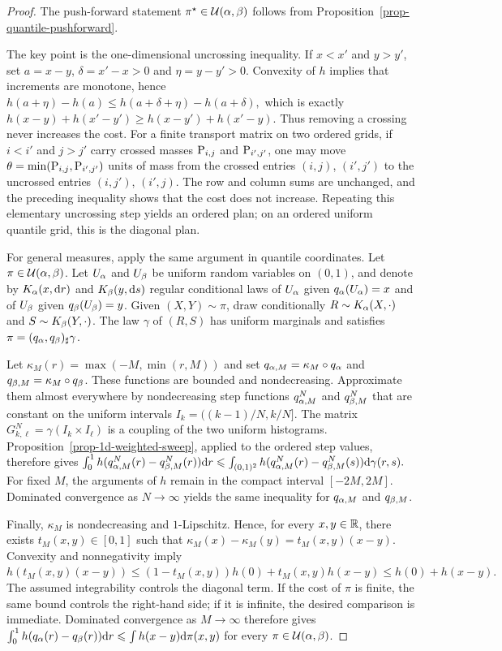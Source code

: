 \begin{proof}
The push-forward statement $\pi^\star\in\Couplings(\al,\be)$ follows from Proposition~\ref{prop-quantile-pushforward}.

The key point is the one-dimensional uncrossing inequality. If $x<x'$ and $y>y'$, set $a=x-y$, $\delta=x'-x>0$ and $\eta=y-y'>0$. Convexity of $h$ implies that increments are monotone, hence
\(h(a+\eta)-h(a) \leq h(a+\delta+\eta)-h(a+\delta),\)
which is exactly
\(h(x-y)+h(x'-y') \geq h(x-y')+h(x'-y)\).
Thus removing a crossing never increases the cost. For a finite transport matrix on two ordered grids, if $i<i'$ and $j>j'$ carry crossed masses $\P_{i,j}$ and $\P_{i',j'}$, one may move $\theta=\min(\P_{i,j},\P_{i',j'})$ units of mass from the crossed entries $(i,j)$, $(i',j')$ to the uncrossed entries $(i,j')$, $(i',j)$. The row and column sums are unchanged, and the preceding inequality shows that the cost does not increase. Repeating this elementary uncrossing step yields an ordered plan; on an ordered uniform quantile grid, this is the diagonal plan.

For general measures, apply the same argument in quantile coordinates. Let $\pi\in\Couplings(\al,\be)$. Let $U_\al$ and $U_\be$ be uniform random variables on $(0,1)$, and denote by $K_\al(x,\d r)$ and $K_\be(y,\d s)$ regular conditional laws of $U_\al$ given $q_\al(U_\al)=x$ and of $U_\be$ given $q_\be(U_\be)=y$. Given $(X,Y)\sim\pi$, draw conditionally $R\sim K_\al(X,\cdot)$ and $S\sim K_\be(Y,\cdot)$. The law $\gamma$ of $(R,S)$ has uniform marginals and satisfies $\pi=(q_\al,q_\be)_\sharp\gamma$.

Let $\kappa_M(r)=\max(-M,\min(r,M))$ and set $q_{\al,M}=\kappa_M\circ q_\al$ and $q_{\be,M}=\kappa_M\circ q_\be$. These functions are bounded and nondecreasing. Approximate them almost everywhere by nondecreasing step functions $q_{\al,M}^N$ and $q_{\be,M}^N$ that are constant on the uniform intervals $I_k=((k-1)/N,k/N]$. The matrix
\(G_{k,\ell}^N=\gamma(I_k\times I_\ell)\)
is a coupling of the two uniform histograms. Proposition~\ref{prop-1d-weighted-sweep}, applied to the ordered step values, therefore gives
\(\int_0^1 h(q_{\al,M}^N(r)-q_{\be,M}^N(r))\d r \leq \int_{(0,1)^2}h(q_{\al,M}^N(r)-q_{\be,M}^N(s))\d\gamma(r,s).\)
For fixed $M$, the arguments of $h$ remain in the compact interval $[-2M,2M]$. Dominated convergence as $N\to\infty$ yields the same inequality for $q_{\al,M}$ and $q_{\be,M}$.

Finally, $\kappa_M$ is nondecreasing and $1$-Lipschitz. Hence, for every $x,y\in\RR$, there exists $t_M(x,y)\in[0,1]$ such that
\(\kappa_M(x)-\kappa_M(y)=t_M(x,y)(x-y)\).
Convexity and nonnegativity imply
\(h(t_M(x,y)(x-y)) \leq (1-t_M(x,y))h(0)+t_M(x,y)h(x-y) \leq h(0)+h(x-y).\)
The assumed integrability controls the diagonal term. If the cost of $\pi$ is finite, the same bound controls the right-hand side; if it is infinite, the desired comparison is immediate. Dominated convergence as $M\to\infty$ therefore gives
\(\int_0^1 h(q_\al(r)-q_\be(r))\d r \leq \int h(x-y)\d\pi(x,y)\)
for every $\pi\in\Couplings(\al,\be)$.
\end{proof}
